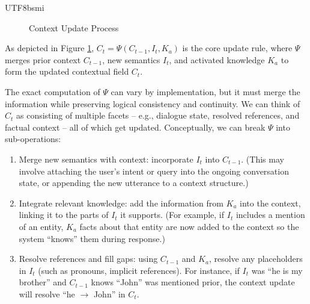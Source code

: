 \documentclass{article}
\begin{document}
\begin{CJK*}{UTF8}{bsmi}
\begin{figure}[htbp] %
    \centering
    \caption{Context Update Process}
    \label{fig:context_update}
\end{figure}

As depicted in Figure \ref{fig:context_update}, $C_t = \Psi(C_{t-1}, I_t, K_a)$ is the core update rule, where $\Psi$ merges prior context $C_{t-1}$, new semantics $I_t$, and activated knowledge $K_a$ to form the updated contextual field $C_t$.

The exact computation of $\Psi$ can vary by implementation, but it must merge the information while preserving logical consistency and continuity. We can think of $C_t$ as consisting of multiple facets – e.g., dialogue state, resolved references, and factual context – all of which get updated. Conceptually, we can break $\Psi$ into sub-operations:
\begin{enumerate}
    \item Merge new semantics with context: incorporate $I_t$ into $C_{t-1}$. (This may involve attaching the user’s intent or query into the ongoing conversation state, or appending the new utterance to a context structure.)
    \item Integrate relevant knowledge: add the information from $K_a$ into the context, linking it to the parts of $I_t$ it supports. (For example, if $I_t$ includes a mention of an entity, $K_a$ facts about that entity are now added to the context so the system “knows” them during response.)
    \item Resolve references and fill gaps: using $C_{t-1}$ and $K_a$, resolve any placeholders in $I_t$ (such as pronouns, implicit references). For instance, if $I_t$ was “he is my brother” and $C_{t-1}$ knows “John” was mentioned prior, the context update will resolve “he $\to$ John” in $C_t$.
\end{enumerate}


\end{CJK*}
\end{document}
